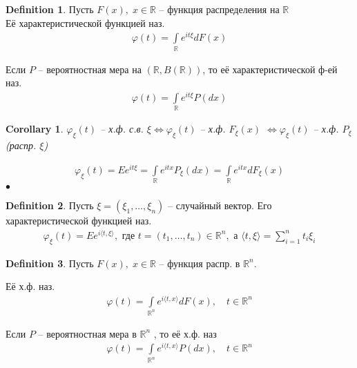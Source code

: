 \documentclass[a4paper]{article}
\theoremstyle{plain}
\newtheorem{corollary}{Corollary}
\theoremstyle{remark}
\theoremstyle{definition}
\newtheorem{definition}{Definition}
\renewenvironment{proof}{{\bfseries Proof}}{$\bullet$}
\newcommand{\setR}{\mathbb{R}}
\newcommand{\setRn}{\mathbb{R}^n}
\renewcommand{\phi}{\varphi}
\begin{document}
\begin{definition}
  Пусть $F(x),\; x \in \setR$ -- функция распределения на $\setR$\\
  Её характеристической функцией наз.
  \begin{align*}
    \phi(t) = \int\limits_{\setR} e^{i t \xi} dF(x)
  \end{align*}

  Если $P$ -- вероятностная мера на $(\setR, B(\setR))$, то её характеристической ф-ей наз.
  \begin{align*}
    \phi(t) = \int\limits_{\setR} e^{it\xi} P(dx)
  \end{align*}
\end{definition}

\begin{corollary}
  $\phi_\xi (t)$ -- х.ф. с.в. $\xi \iff  \phi_{\xi} (t)$ -- х.ф. $F_{\xi}(x)$
  $\iff \phi_{\xi} (t)$ -- х.ф. $P_{\xi}$ (распр. $\xi$)

  \begin{proof}
    \begin{align*}
      \phi_{\xi} (t) = E e^{i t \xi} = \int\limits_{\setR} e^{i t x} P_{\xi} (dx) 
      = \int\limits_{\setR} e^{i t x} dF_{\xi} (x)
    \end{align*}
  \end{proof}

\end{corollary}

\begin{definition}
  Пусть $\xi = (\xi_1, \ldots, \xi_n) $ -- случайный вектор.
  Его характеристической функцией наз.
  \begin{align*}
    \phi_{\xi} (t) = E e^{i \langle t, \xi \rangle}, \text{ где } t = (t_1, \ldots, t_n) \in \setRn, 
    \text{ а } \langle t, \xi \rangle = \sum_{i = 1}^{n} t_i \xi_i
  \end{align*}
\end{definition}

\begin{definition}
  Пусть $F(x), \; x \in \setR$ -- функция распр. в $\setRn$.

  Её х.ф. наз.
  \begin{align*}
    \phi(t) = \int\limits_{\setRn} e^{i \langle t, x \rangle} dF(x),\quad t \in \setRn
  \end{align*}

  Если $P$ -- вероятностная мера в $\setRn$ , то её х.ф. наз
  \begin{align*}
    \phi(t) = \int\limits_{\setRn} e^{i \langle t, x \rangle} P(dx),\quad t \in \setRn
  \end{align*}
\end{definition}
\end{document}

